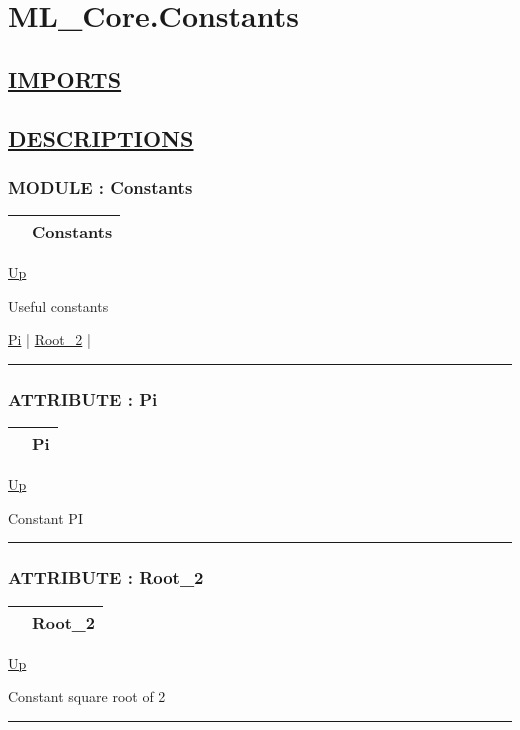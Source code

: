 \chapter*{ML\_Core.Constants}
\hypertarget{ecldoc:toc:ML_Core.Constants}{}

\section*{\underline{IMPORTS}}

\section*{\underline{DESCRIPTIONS}}
\subsection*{MODULE : Constants}
\hypertarget{ecldoc:ML_Core.Constants}{}

{\renewcommand{\arraystretch}{1.5}
\begin{tabularx}{\textwidth}{|>{\raggedright\arraybackslash}l|X|}
\hline
\hspace{0pt} & Constants \\
\hline
\end{tabularx}
}

\hyperlink{ecldoc:toc:ML_Core}{Up}

\par
Useful constants


\hyperlink{ecldoc:ml_core.constants.pi}{Pi}  |
\hyperlink{ecldoc:ml_core.constants.root_2}{Root\_2}  |

\rule{\textwidth}{0.4pt}

\subsection*{ATTRIBUTE : Pi}
\hypertarget{ecldoc:ml_core.constants.pi}{}

{\renewcommand{\arraystretch}{1.5}
\begin{tabularx}{\textwidth}{|>{\raggedright\arraybackslash}l|X|}
\hline
\hspace{0pt} & Pi \\
\hline
\end{tabularx}
}

\hyperlink{ecldoc:ML_Core.Constants}{Up}

\par
Constant PI


\rule{\textwidth}{0.4pt}
\subsection*{ATTRIBUTE : Root\_2}
\hypertarget{ecldoc:ml_core.constants.root_2}{}

{\renewcommand{\arraystretch}{1.5}
\begin{tabularx}{\textwidth}{|>{\raggedright\arraybackslash}l|X|}
\hline
\hspace{0pt} & Root\_2 \\
\hline
\end{tabularx}
}

\hyperlink{ecldoc:ML_Core.Constants}{Up}

\par
Constant square root of 2


\rule{\textwidth}{0.4pt}



